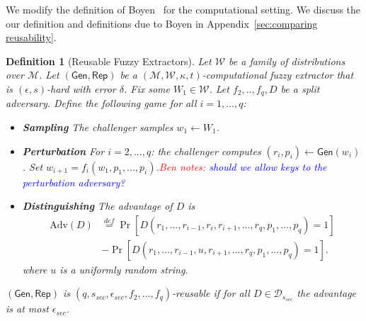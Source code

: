 \documentclass[11pt]{article}
\newcommand{\apref}[1]{\mbox{Appendix~\ref{#1}}}
\newcommand{\class}[1]{{\ensuremath{\mathsf{#1}}}}
\newcommand{\gen}{\ensuremath{\class{Gen}}\xspace}
\newcommand{\rep}{\ensuremath{\class{Rep}}\xspace}
\newtheorem{definition}[theorem]{Definition}
\newcommand{\authnote}[2]{{\textcolor{red}{\textsf{#1 notes: }\textcolor{blue}{ #2}}\marginpar{\textcolor{red}{\textbf{!!!!!}}}}}
\newcommand{\authnote}[2]{}
\newcommand{\bnote}[1]{{\authnote{Ben}{#1}}}
\begin{document}
We modify the definition of Boyen~\cite[Definition 6]{Boyen2004} for the computational setting.  We discuss the our definition and definitions due to Boyen in \apref{sec:comparing reusability}.

\begin{definition}[Reusable Fuzzy Extractors]
\label{def:outsider fuzz ext}
Let $\mathcal{W}$ be a family of distributions over $\mathcal{M}$.  Let $(\gen, \rep)$ be a $(\mathcal{M}, \mathcal{W}, \kappa, t)$-computational fuzzy extractor that is $(\epsilon, s)$-hard with error $\delta$.
Fix some $W_1 \in \mathcal{W}$.  Let $f_2,.., f_q , D$ be a split adversary.  Define the following game for all $i=1,..., q$:
\begin{itemize}%
\item \textbf{Sampling} The challenger samples $w_1\leftarrow W_1$.
\item \textbf{Perturbation} For $i=2,..., q$: the challenger computes $(r_i, p_i)\leftarrow \gen(w_i)$.  Set $w_{i+1} = f_i(w_1, p_1,..., p_i)$.\bnote{should we allow keys to the perturbation adversary?}
\item \textbf{Distinguishing} The advantage of $D$ is
\begin{align*}
\text{Adv}(D)&\overset{def}= \Pr[D(r_1,..., r_{i-1}, r_i, r_{i+1},..., r_q, p_1,..., p_q)=1]\\ &- \Pr[D(r_1,..., r_{i-1}, u, r_{i+1},..., r_q, p_1,..., p_q)=1].
\end{align*}
where $u$ is a uniformly random string.
\end{itemize}
$(\gen, \rep)$ is $(q, s_{sec}, \epsilon_{sec}, f_2,..., f_q)$-reusable if for all $D\in\mathcal{D}_{s_{sec}}$ the advantage is at most $\epsilon_{sec}$.
\end{definition}
\end{document}
